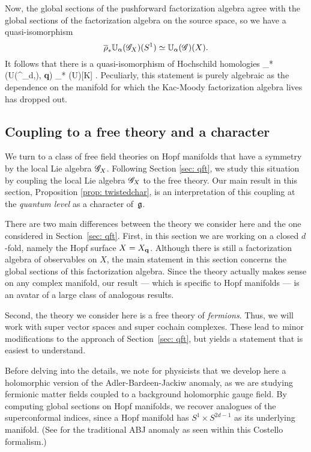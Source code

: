 Now, the global sections of the pushforward factorization algebra agree with the global sections of the factorization algebra on the source space,
so we have a quasi-isomorphism
\[
\overline{\rho}_* \mathbb U_\alpha(\mathscr G_X) (S^1) \simeq \mathbb U_{\alpha} (\mathscr G)(X) .
\]
It follows that there is a quasi-isomorphism of Hochschild homologies
\beqn\label{hoch1}
\Hoch_*(U(\Tilde{\fg}^\bullet_{d,\theta}), {\bf q}) \simeq \Hoch_* (U\fg)[K] .
\eeqn
Peculiarly, this statement is purely algebraic as the dependence on the manifold for which the Kac-Moody factorization algebra lives has dropped out.

\subsection{Coupling to a free theory and a character}

\def\Cl{{\rm Cl}}

We turn to a class of free field theories on Hopf manifolds that have a symmetry by the local Lie algebra $\mathscr G_X$. 
Following Section \ref{sec: qft}, we study this situation by coupling the local Lie algebra $\mathscr G_X$ to the free theory.
Our main result in this section, Proposition \ref{prop: twistedchar}, is an interpretation of this coupling at the {\em quantum level} as a character of~$\mathfrak g$. 

There are two main differences between the theory we consider here and the one considered in Section~\ref{sec: qft}.
First, in this section we are working on a closed $d$-fold, namely the Hopf surface $X = X_{\bf q}$. 
Although there is still a factorization algebra of observables on $X$, the main statement in this section concerns the global sections of this factorization algebra.
Since the theory actually makes sense on any complex manifold, 
our result --- which is specific to Hopf manifolds --- is an avatar of a large class of analogous results.

Second, the theory we consider here is a free theory of {\em fermions}. 
Thus, we will work with super vector spaces and super cochain complexes.
These lead to minor modifications to the approach of Section~\ref{sec: qft}, 
but yields a statement that is easiest to understand.

Before delving into the details, 
we note for physicists that we develop here a holomorphic version of the Adler-Bardeen-Jackiw anomaly,
as we are studying fermionic matter fields coupled to a background holomorphic gauge field.
By computing global sections on Hopf manifolds,
we recover analogues of the superconformal indices,
since a Hopf manifold has $S^1 \times S^{2d-1}$ as its underlying manifold.
(See \cite{Rabinowich} for the traditional ABJ anomaly as seen within this Costello formalism.)

